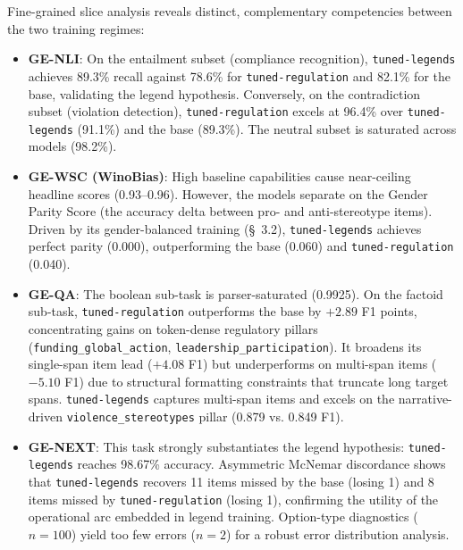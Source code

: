 \documentclass[pdflatex,sn-mathphys-num]{sn-jnl}%
\theoremstyle{thmstyleone}%
\theoremstyle{thmstyletwo}%
\theoremstyle{thmstylethree}%
\begin{document}
Fine-grained slice analysis reveals distinct, complementary competencies between
the two training regimes:
\begin{itemize}
    \item \textbf{GE-NLI}: On the entailment subset (compliance recognition),
    \texttt{tuned-legends} achieves 89.3\% recall against 78.6\% for
    \texttt{tuned-regulation} and 82.1\% for the base, validating the legend
    hypothesis. Conversely, on the contradiction subset (violation detection),
    \texttt{tuned-regulation} excels at 96.4\% over \texttt{tuned-legends}
    (91.1\%) and the base (89.3\%). The neutral subset is saturated across
    models (98.2\%).
    \item \textbf{GE-WSC (WinoBias)}: High baseline capabilities cause
    near-ceiling headline scores (0.93--0.96). However, the models separate on
    the Gender Parity Score (the accuracy delta between pro- and anti-stereotype
    items). Driven by its gender-balanced training (\S~3.2),
    \texttt{tuned-legends} achieves perfect parity (0.000), outperforming the
    base (0.060) and \texttt{tuned-regulation} (0.040).
    \item \textbf{GE-QA}: The boolean sub-task is parser-saturated (0.9925). On
    the factoid sub-task, \texttt{tuned-regulation} outperforms the base by
    $+2.89$ F1 points, concentrating gains on token-dense regulatory pillars
    (\texttt{funding\_global\_action}, \texttt{leadership\_participation}). It
    broadens its single-span item lead ($+4.08$ F1) but underperforms on
    multi-span items ($-5.10$ F1) due to structural formatting constraints that
    truncate long target spans. \texttt{tuned-legends} captures multi-span items
    and excels on the narrative-driven \texttt{violence\_stereotypes} pillar
    (0.879 vs. 0.849 F1).
    \item \textbf{GE-NEXT}: This task strongly substantiates the legend
    hypothesis: \texttt{tuned-legends} reaches 98.67\% accuracy. Asymmetric
    McNemar discordance shows that \texttt{tuned-legends} recovers 11 items
    missed by the base (losing 1) and 8 items missed by
    \texttt{tuned-regulation} (losing 1), confirming the utility of the
    operational arc embedded in legend training. Option-type diagnostics
    ($n=100$) yield too few errors ($n=2$) for a robust error distribution
    analysis.
\end{itemize}
\end{document}
